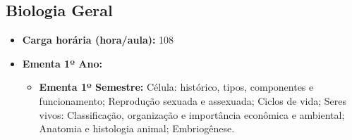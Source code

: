 \documentclass[11pt,fleqn]{book} %
\begin{document}
\subsection{Biologia Geral}\label{disc:biologia}
\begin{itemize}
	\item \textbf{Carga horária (hora/aula):} 108
	\item \textbf{Ementa 1º Ano:}
	\begin{itemize}
		\item \textbf{Ementa 1º Semestre:} 
		Célula: histórico, tipos, componentes e funcionamento; 
		Reprodução sexuada e assexuada; 
		Ciclos de vida; 
		Seres vivos: Classificação, organização e importância econômica e ambiental; 
		Anatomia e histologia animal;
		Embriogênese.
		

\end{itemize}
\end{itemize}
\end{document}
